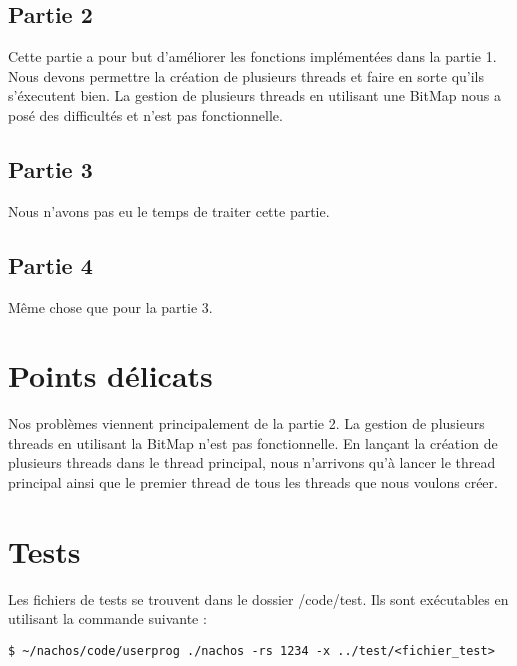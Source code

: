 \documentclass[a4paper]{article}
\begin{document}
\subsection{Partie 2}
Cette partie a pour but d'améliorer les fonctions implémentées dans la partie 1.
Nous devons permettre la création de plusieurs threads et faire en sorte qu'ils
s'éxecutent bien. La gestion de plusieurs threads en utilisant une BitMap nous a
posé des difficultés et n'est pas fonctionnelle.

\subsection{Partie 3}
Nous n'avons pas eu le temps de traiter cette partie.

\subsection{Partie 4}
Même chose que pour la partie 3.


\newpage
\section{Points délicats}

Nos problèmes viennent principalement de la partie 2. La gestion de plusieurs
threads en utilisant la BitMap n'est pas fonctionnelle. En lançant la création
de plusieurs threads dans le thread principal, nous n'arrivons qu'à lancer le
thread principal ainsi que le premier thread de tous les threads que nous
voulons créer.


\section{Tests}

Les fichiers de tests se trouvent dans le dossier /code/test. Ils sont exécutables
en utilisant la commande suivante :

\begin{verbatim}
$ ~/nachos/code/userprog ./nachos -rs 1234 -x ../test/<fichier_test>
\end{verbatim}
\end{document}
